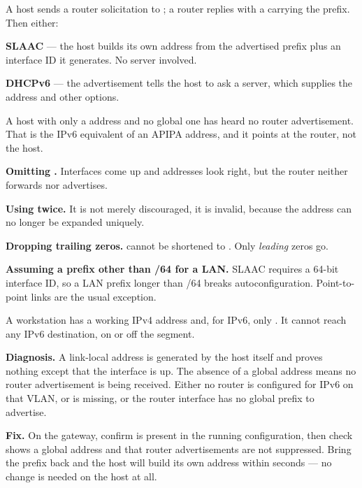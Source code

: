 \begin{conceptbox}
A host sends a router solicitation to ; a router replies with a
 carrying the prefix. Then either:
\begin{tight}
  \item \textbf{SLAAC} --- the host builds its own address from the advertised
        prefix plus an interface ID it generates. No server involved.
  \item \textbf{DHCPv6} --- the advertisement tells the host to ask a server,
        which supplies the address and other options.
\end{tight}
A host with only a  address and no global one has heard no router
advertisement. That is the IPv6 equivalent of an APIPA address, and it points at
the router, not the host.
\end{conceptbox}

\begin{pitfall}
\begin{tight}
  \item \textbf{Omitting .} Interfaces come up and
        addresses look right, but the router neither forwards nor advertises.
  \item \textbf{Using \cmd{::} twice.} It is not merely discouraged, it is
        invalid, because the address can no longer be expanded uniquely.
  \item \textbf{Dropping trailing zeros.}  cannot be
        shortened to . Only \emph{leading} zeros go.
  \item \textbf{Assuming a prefix other than /64 for a LAN.} SLAAC requires a
        64-bit interface ID, so a LAN prefix longer than /64 breaks
        autoconfiguration. Point-to-point links are the usual exception.
\end{tight}
\end{pitfall}

\begin{breakfix}
A workstation has a working IPv4 address and, for IPv6, only
. It cannot reach any IPv6 destination, on or off
the segment.

\textbf{Diagnosis.} A link-local address is generated by the host itself and
proves nothing except that the interface is up. The absence of a global address
means no router advertisement is being received. Either no router is configured
for IPv6 on that VLAN, or  is missing, or the router
interface has no global prefix to advertise.

\textbf{Fix.} On the gateway, confirm  is present in the
running configuration, then check 
shows a global address and that router advertisements are not suppressed. Bring
the prefix back and the host will build its own address within seconds --- no
change is needed on the host at all.
\end{breakfix}


